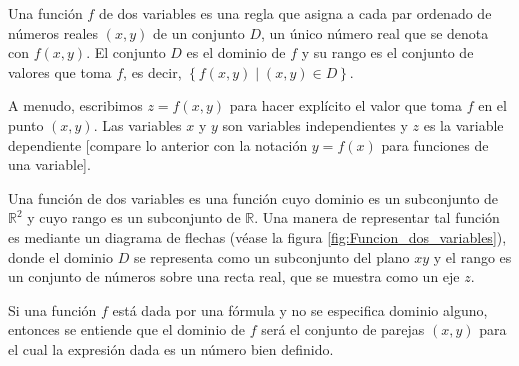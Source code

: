 \begin{definition}
    Una función $f$ de dos variables es una regla que asigna a cada par ordenado de números reales $(x, y)$ de un conjunto $D$, un único número real que se denota con $f(x, y)$. El conjunto $D$ es el dominio de $f$ y su rango es el conjunto de valores que toma $f$, es decir, $\left\{ f(x, y) \mid (x, y) \in D \right\}$.
\end{definition}

A menudo, escribimos $z = f(x, y)$ para hacer explícito el valor que toma $f$ en el punto $(x, y)$. Las variables $x$ y $y$ son variables independientes y $z$ es la variable dependiente [compare lo anterior con la notación $y = f(x)$ para funciones de una variable].

Una función de dos variables es una función cuyo dominio es un subconjunto de $\mathbb{R}^2$ y cuyo rango es un subconjunto de $\mathbb{R}$. Una manera de representar tal función es mediante un diagrama de flechas (véase la figura \ref{fig:Funcion_dos_variables}), donde el dominio $D$ se representa como un subconjunto del plano $x y$ y el rango es un conjunto de números sobre una recta real, que se muestra como un eje $z$. %

Si una función $f$ está dada por una fórmula y no se especifica dominio alguno, entonces se entiende que el dominio de $f$ será el conjunto de parejas $(x, y)$ para el cual la expresión dada es un número bien definido.

